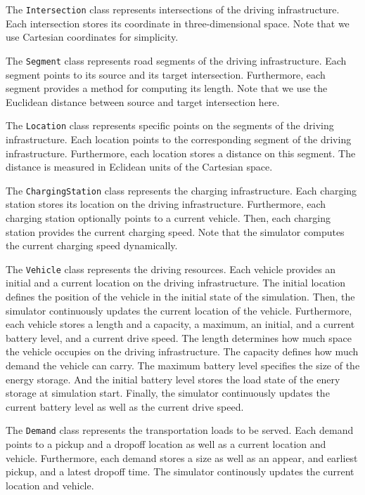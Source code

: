 \documentclass[a4paper,twoside]{article}
\begin{document}
	The \texttt{Intersection} class represents intersections of the driving infrastructure.
	Each intersection stores its coordinate in three-dimensional space.
	Note that we use Cartesian coordinates for simplicity.
	
	The \texttt{Segment} class represents road segments of the driving infrastructure.
	Each segment points to its source and its target intersection.
	Furthermore, each segment provides a method for computing its length.
	Note that we use the Euclidean distance between source and target intersection here.
	
	The \texttt{Location} class represents specific points on the segments of the driving infrastructure.
	Each location points to the corresponding segment of the driving infrastructure.
	Furthermore, each location stores a distance on this segment.
	The distance is measured in Eclidean units of the Cartesian space.
	
	The \texttt{ChargingStation} class represents the charging infrastructure.
	Each charging station stores its location on the driving infrastructure.
	Furthermore, each charging station optionally points to a current vehicle.
	Then, each charging station provides the current charging speed.
	Note that the simulator computes the current charging speed dynamically.
	
	The \texttt{Vehicle} class represents the driving resources.
	Each vehicle provides an initial and a current location on the driving infrastructure.
	The initial location defines the position of the vehicle in the initial state of the simulation.
	Then, the simulator continuously updates the current location of the vehicle.
	Furthermore, each vehicle stores a length and a capacity, a maximum, an initial, and a current battery level, and a current drive speed.
	The length determines how much space the vehicle occupies on the driving infrastructure.
	The capacity defines how much demand the vehicle can carry.
	The maximum battery level specifies the size of the energy storage.
	And the initial battery level stores the load state of the enery storage at simulation start.
	Finally, the simulator continuously updates the current battery level as well as the current drive speed.
	
	The \texttt{Demand} class represents the transportation loads to be served.
	Each demand points to a pickup and a dropoff location as well as a current location and vehicle.
	Furthermore, each demand stores a size as well as an appear, and earliest pickup, and a latest dropoff time.
	The simulator continously updates the current location and vehicle.
	
\end{document}
